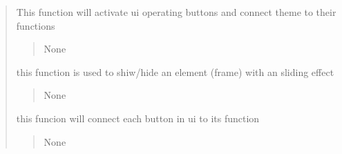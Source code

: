 \documentclass[letterpaper,10pt,english]{sphinxmanual}
\begin{document}
\begin{quote}
\begin{savenotes}
\begin{fulllineitems}
\begin{savenotes}\begin{fulllineitems}
\label{\detokenize{setting/setting_UI:oxin.setting_UI.UI_main_window.activate_}}
\pysigstartsignatures
{}
\pysigstopsignatures
\sphinxAtStartPar
This function will activate ui operating buttons and connect theme to their functions
\begin{quote}\begin{description}
\sphinxAtStartPar
None

\end{description}\end{quote}

\end{fulllineitems}\end{savenotes}


\begin{savenotes}\begin{fulllineitems}
\label{\detokenize{setting/setting_UI:oxin.setting_UI.UI_main_window.animation_move}}
\pysigstartsignatures
{}
\pysigstopsignatures
\sphinxAtStartPar
this function is used to shiw/hide an element (frame) with an sliding effect
\begin{quote}\begin{description}
\sphinxAtStartPar
None

\end{description}\end{quote}

\end{fulllineitems}\end{savenotes}


\begin{savenotes}\begin{fulllineitems}
\label{\detokenize{setting/setting_UI:oxin.setting_UI.UI_main_window.buttonClick}}
\pysigstartsignatures
{}
\pysigstopsignatures
\sphinxAtStartPar
this funcion will connect each button in ui to its function
\begin{quote}\begin{description}
\sphinxAtStartPar
None


\end{description}
\end{quote}
\end{fulllineitems}
\end{savenotes}
\end{fulllineitems}
\end{savenotes}
\end{quote}
\end{document}
